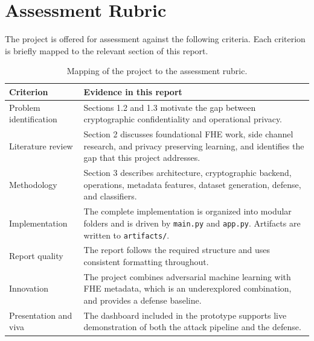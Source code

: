 \documentclass[12pt,a4paper]{article}
\begin{document}
\section{Assessment Rubric}
The project is offered for assessment against the following criteria. Each criterion is briefly mapped to the relevant section of this report.

\begin{table}[h]
\centering
\caption{Mapping of the project to the assessment rubric.}
\label{tab:rubric}
\renewcommand{\arraystretch}{1.25}
\begin{tabular}{p{4.2cm}p{10.2cm}}
\toprule
\textbf{Criterion} & \textbf{Evidence in this report} \\
\midrule
Problem identification     & Sections 1.2 and 1.3 motivate the gap between cryptographic confidentiality and operational privacy. \\
Literature review          & Section 2 discusses foundational FHE work, side channel research, and privacy preserving learning, and identifies the gap that this project addresses. \\
Methodology                & Section 3 describes architecture, cryptographic backend, operations, metadata features, dataset generation, defense, and classifiers. \\
Implementation             & The complete implementation is organized into modular folders and is driven by \texttt{main.py} and \texttt{app.py}. Artifacts are written to \texttt{artifacts/}. \\
Report quality             & The report follows the required structure and uses consistent formatting throughout. \\
Innovation                 & The project combines adversarial machine learning with FHE metadata, which is an underexplored combination, and provides a defense baseline. \\
Presentation and viva      & The dashboard included in the prototype supports live demonstration of both the attack pipeline and the defense. \\
\bottomrule
\end{tabular}
\end{table}
\end{document}
